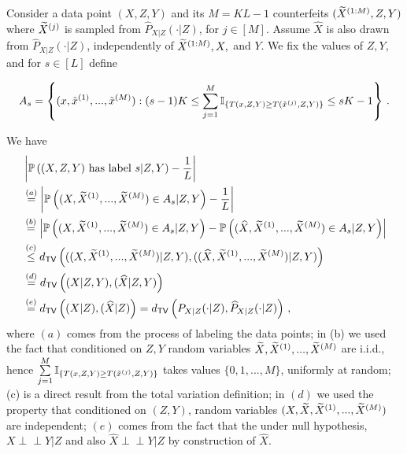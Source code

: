 \documentclass[11pt]{article}
\newcommand{\indep}{\perp \!\!\! \perp}
\def\hP{\widehat{P}}
\def\hX{\widehat{X}}
\def\tv{\mathsf{TV}}
\begin{document}
	Consider a data point $(X,Z,Y)$ and its $M=KL-1$  counterfeits $({\widetilde{X}}^{(1:M)},Z,Y)$ where ${\widetilde{X}}^{(j)}$ is sampled from $\hP_{X|Z}(\cdot|Z)$, for $j\in [M]$.  Assume $\hX$ is also drawn from $\hP_{X|Z}(\cdot|Z)$,  independently of ${\widetilde{X}}^{(1:M)},X,$ and $Y$.
	We fix the values of $Z,Y$, and for $s\in [L]$ define
	
	
	\[
	A_s=\left\{(x,\tilde{x}^{(1)},...,\tilde{x}^{(M)}): (s-1)K\leq \sum\limits_{j=1}^{M}{\mathbb I}_{\{T(x,Z,Y)\geq T(\tilde{x}^{(j)},Z,Y)\}} \leq sK-1  \right\}\,.
	\]
	
	We have
	\begin{align}
		&\left|\prob\left( (X,Z,Y) \text{ has label } s|Z,Y  \right)- \frac{1}{L} \right|\nonumber\\
		&\overset{(a)}{=}\left|\prob\left( (X,\tX^{(1)},...,\tX^{(M)}) \in A_s|Z,Y  \right)-\frac{1}{L} \right|\nonumber\\
		&\overset{(b)}{=}\left|\prob\left( (X,\tX^{(1)},...,\tX^{(M)}) \in A_s|Z,Y  \right)-\prob\left( (\hX,\tX^{(1)},...,\tX^{(M)}) \in A_s|Z,Y  \right) \right|\nonumber\\
		&\overset{(c)}{\leq} d_{\tv}\left(((X,\tX^{(1)},...,\tX^{(M)})|Z,Y),  ((\hX,\tX^{(1)},...,\tX^{(M)})|Z,Y)  \right)\nonumber\\
		&\overset{(d)}{=}d_{\tv}\left((X|Z,Y),(\hX|Z,Y)   \right)\nonumber\\
		&\overset{(e)}{=}d_{\tv}\left((X|Z),(\hX|Z)   \right)=d_{\tv}\left( P_{X|Z}(\cdot|Z),\hP_{X|Z}(\cdot|Z)  \right)\label{eq:robust-prob-upper}\,,
	\end{align}
	where $(a)$ comes from the process of labeling the data points; in (b) we used the fact that conditioned on $Z,Y$ random variables ${\widetilde{X}},{\widetilde{X}}^{(1)},...,{\widetilde{X}}^{(M)}$ are i.i.d.,  hence $\sum\limits_{j=1}^{M}{\mathbb I}_{\{T(x,Z,Y)\geq T(\tilde{x}^{(j)},Z,Y)\}}$ takes values  $\{0,1,...,M\}$, uniformly at random; (c) is a direct result from the total variation definition; in $(d)$ we used the property that conditioned on $(Z,Y)$, random variables $(X,{\widetilde{X}},{\widetilde{X}}^{(1)},...,{\widetilde{X}}^{(M)})$ are independent; $(e)$ comes from the fact that the under null hypothesis, $X\indep Y|Z$ and also $\hX\indep Y|Z$ by construction of $\hX$. 
	
\end{document}
